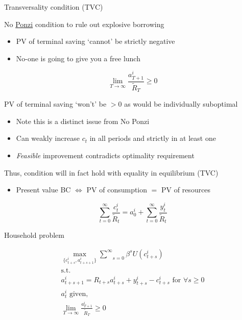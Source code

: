 
\begin{frame}{Transversality condition (TVC)}

No \href{https://en.wikipedia.org/wiki/Ponzi_scheme}{Ponzi} condition to rule out explosive borrowing
	\begin{itemize}
	\item	PV of terminal saving `cannot' be strictly negative
	\item	No-one is going to give you a free lunch
	\end{itemize}
\begin{equation*}
\lim_{T\rightarrow \infty} \frac{a_{T+1}^{i}}{\tilde{R}_{T}}\geq 0
\end{equation*}

PV of terminal saving `won't' be $>0$ as would be individually suboptimal
	\begin{itemize}
	\item	Note this is a distinct issue from No Ponzi
	\item	Can weakly increase $c_{t}$ in all periods and strictly in at least one
	\item	\textit{Feasible} improvement contradicts optimality requirement
	\end{itemize}
\vspace{1.5mm}
Thus, condition will in fact hold with equality in equilibrium (TVC)
\begin{itemize}
\item	Present value BC $\Leftrightarrow$ PV of consumption $=$ PV of resources
\end{itemize}
\begin{equation*}
\sum\limits_{t=0}^{\infty }\frac{c_{t}^{i}}{\tilde{R}_{t}}=a_{0}^{i}+\sum\limits_{t=0}^{\infty }\frac{y_{t}^{i}}{\tilde{R}_{t}}
\end{equation*}

\end{frame}


\begin{frame}{Household problem}

\begin{gather*}
\underset{\{c_{t+s}^{i},a_{t+s+1}^{i}\}}{\max }\underset{s=0}{\overset{\infty }{\sum }}\beta ^{s}U(c_{t+s}^{i}) \\[0.3cm]
\text{s.t.} \\[0.3cm]
a_{t+s+1}^{i}=R_{t+s}a_{t+s}^{i}+y_{t+s}^{i}-c_{t+s}^{i}\text{ for }\forall s\geq 0 \\[0.5cm]
a_{t}^{i}\text{ given,}\\[0.3cm]
\underset{T\rightarrow \infty }{\lim }\frac{a_{T+1}^{i}}{\tilde{R}_{T}}\geq 0
\end{gather*}

\end{frame}

